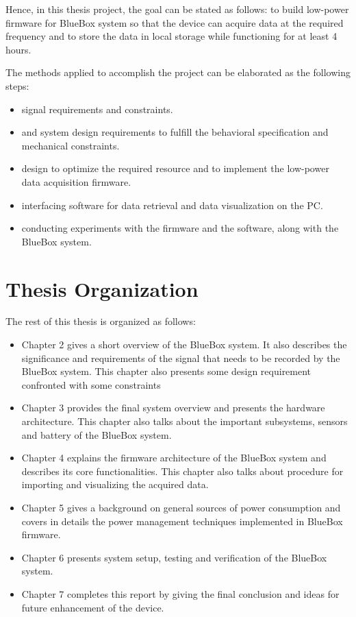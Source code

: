 Hence, in this thesis project, the goal can be stated as follows:
to build low-power firmware for BlueBox system so that the device can
acquire data at the required frequency and to store the data in local
storage while functioning for at least 4 hours. 
 
 The methods applied to accomplish the project can be elaborated as the following steps:
 \begin{itemize}
	\item signal requirements and constraints. 
 	
	\item and system design requirements to fulfill the behavioral
		specification and mechanical constraints.
 	
	\item design to optimize the required resource and to implement the
		low-power data acquisition firmware.
 	
	\item interfacing software for data retrieval and data
		visualization on the PC.
 	
	\item conducting experiments with the firmware and the software,
		along with the BlueBox system.
 \end{itemize}
 
\section{Thesis Organization}
The rest of this thesis is organized as follows:
\begin{itemize}
	\item Chapter 2 gives a short overview of the BlueBox system. It also describes the significance and requirements of the signal that needs to be recorded by the BlueBox system. This chapter also presents some design requirement confronted with some constraints
	
	\item Chapter 3 provides the final system overview and presents the hardware architecture. This chapter also talks about the important subsystems, sensors and battery of the BlueBox system.
	
	\item Chapter 4 explains the firmware architecture of the BlueBox system and describes its core functionalities. This chapter also talks about procedure for importing and visualizing the acquired data.
	
	\item Chapter 5 gives a background on general sources of power consumption and covers in details the power management techniques implemented in BlueBox firmware.
	
	\item Chapter 6 presents system setup, testing and verification of the BlueBox system. 
	
	\item
	Chapter 7 completes this report by giving the final conclusion and ideas for future enhancement of the device.
	
\end{itemize}
